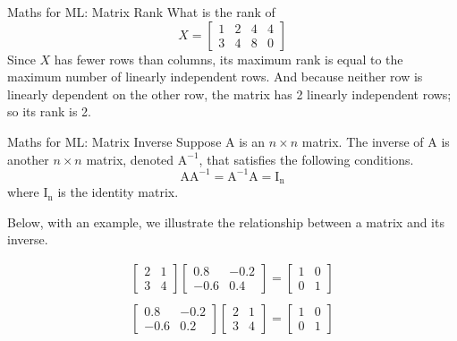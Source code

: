 \documentclass{beamer}
\begin{document}
\begin{frame}{Maths for ML: Matrix Rank}
What is the rank of
\begin{equation*}
 X=\left[\begin{array}{llll}
{1} & {2} & {4} & {4} \\
{3} & {4} & {8} & {0}
\end{array}\right]
\end{equation*}
\pause Since $X$ has fewer rows than columns, its maximum rank is equal to the maximum number of linearly independent rows. And because neither row is linearly dependent on the other row, the matrix has 2 linearly independent rows; so its rank is 2.
\end{frame}

\begin{frame}{Maths for ML: Matrix Inverse}
Suppose $\mathrm{A}$ is an $n \times n$ matrix. The inverse of $\mathrm{A}$ is another $n \times n$ matrix, denoted $\mathrm{A}^{-1}$, that satisfies the following conditions.
\[
\mathrm{AA}^{-1}=\mathrm{A}^{-1} \mathrm{A}=\mathrm{I}_{\mathrm{n}}
\]
\pause 
where $\mathrm{I}_{\mathrm{n}}$ is the identity matrix.

\pause  Below, with an example, we illustrate the relationship between a matrix and its inverse.

\pause \[
\begin{array}{l}
{\left[\begin{array}{cc}
	{2} & {1} \\
	{3} & {4}
	\end{array}\right]\left[\begin{array}{cc}
	{0.8} & {-0.2} \\
	{-0.6} & {0.4}
	\end{array}\right]=\left[\begin{array}{ll}
	{1} & {0} \\
	{0} & {1}
	\end{array}\right]} \\ \\
{\left[\begin{array}{cc}
	{0.8} & {-0.2} \\
	{-0.6} & {0.2}
	\end{array}\right]\left[\begin{array}{ll}
	{2} & {1} \\
	{3} & {4}
	\end{array}\right]=\left[\begin{array}{ll}
	{1} & {0} \\
	{0} & {1}
	\end{array}\right]}
\end{array}
\]

\end{frame}
\end{document}
